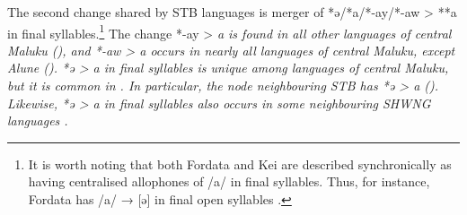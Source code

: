 \largerpage
{}
The second change shared by STB languages is merger of *ə/*a/*-ay/*-aw
> **a in final syllables.\footnote{
		It is worth noting that both
		Fordata and Kei are described synchronically
		as having centralised allophones of /a/ in final syllables.
		Thus, for instance, Fordata has /a/ → [ə] in final open syllables
		\citep[192]{Marshall2000}.}
The change *-ay > \it{a} is found
in all other languages of central Maluku (),
and *-aw > \it{a} occurs in nearly all languages of central Maluku,
except Alune ().
*ə > \it{a} in final syllables is unique among languages
of central Maluku, but it is common in .
In particular, the  node neighbouring
STB has *ə > \it{a} ().
Likewise, *ə > \it{a} in final syllables also occurs in some
neighbouring SHWNG languages \citep[79f]{Kamholz2014}.

